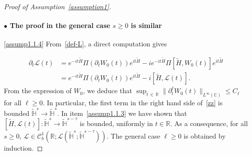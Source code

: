 \documentclass[10pt]{amsart}
\theoremstyle{definition}\newtheorem{defi}[theo]{Definition}\newtheorem{rema}[theo]{Remark}\newtheorem{exam}[theo]{Example}\newtheorem{exem}[theo]{Example}\newtheorem{nota}[theo]{Notation}
\newcommand{\C}{\mathbb{C}}
\newcommand{\R}{\mathbb{R}}
\newcommand{\HH}{\mathbb{H}}
\newcommand{\clL}{\mathcal{L}}
\newcommand{\clC}{\mathcal{C}}
\renewcommand{\L}{\mathscr{L}}
\newcommand{\wt}{\widetilde}
\newcommand{\<}{\langle}
\renewcommand{\>}{\rangle}
\begin{document}
\begin{proof}[{Proof of Assumption~\ref{assumption1}}]
\paragraph{$\bullet$ The proof in the general case $s\geq 0$ is similar}\phantom{--}

\eqref{assump1.1.4} From~\eqref{def-L}, a direct computation gives

\begin{equation}\label{zz}
\begin{aligned}
\partial_t \L(t)&= e^{-it \wt{H}} \Pi \left(\partial_t W_0(t)\right)e^{it \wt{H}} -i e^{-it \wt{H}} \Pi \left[\wt{H}, W_0(t)\right]e^{it \wt{H}}\\
&= e^{-it \wt{H}} \Pi \left(\partial_t W_0(t)\right)e^{it \wt{H}} -i \left[\wt{H}, \L(t)\right].
\end{aligned}
\end{equation}
From the expression of $W_0$, we deduce that $\sup_{t\,\in\,\R}\| \partial^{\ell}_t W_0(t)\|_{L^{\infty}(\C)} \leq C_{\ell}$ for all $\ell \geq 0$. In particular, the first term in the right hand side of~\eqref{zz} is bounded $\widetilde{\HH}^{s} \longrightarrow \widetilde{\HH}^{s}$. In item~\eqref{assump1.1.3} we have shown that $[\wt{H}, \L(t)] : \widetilde{\HH}^{s} \longrightarrow \widetilde{\HH}^{s-\tau}$ is bounded, uniformly in $t\in
\R$. As a consequence, for all $s\geq 0$, $\L \in \clC^{1}_b(\R; \clL(\widetilde{\HH}^{s} ; \widetilde{\HH}^{s- \tau}))$. The general case $\ell\geq 0$ is obtained by induction.
\end{proof}
\end{document}
